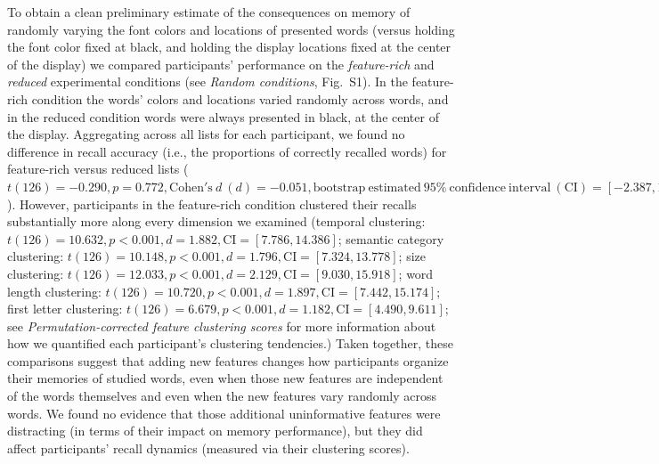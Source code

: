 \documentclass[11pt]{article}
\newcommand{\dynamicsRandom}{S1}
\begin{document}
To obtain a clean preliminary estimate of the consequences on memory of
randomly varying the font colors and locations of presented words (versus
holding the font color fixed at black, and holding the display locations fixed
at the center of the display) we compared participants' performance on the
\textit{feature-rich} and \textit{reduced} experimental conditions (see
\textit{Random conditions}, Fig.~\dynamicsRandom). In the feature-rich
condition the words' colors and locations varied randomly across words, and in
the reduced condition words were always presented in black, at the center of
the display. Aggregating across all lists for each participant, we found no
difference in recall accuracy (i.e., the proportions of correctly recalled
words) for feature-rich versus reduced lists ($t(126) = -0.290, p = 0.772,
\mathrm{Cohen's}~d~(d) = -0.051,
\mathrm{bootstrap~estimated~95\%~confidence~interval}~(\mathrm{CI}) = [-2.387,
1.768]$). However, participants in the feature-rich condition clustered their
recalls substantially more along every dimension we examined (temporal
clustering: $t(126) = 10.632, p < 0.001, d = 1.882, \mathrm{CI} = [7.786,
14.386]$; semantic category clustering: $t(126) = 10.148, p < 0.001, d = 1.796,
\mathrm{CI} = [7.324, 13.778] $; size clustering: $t(126) = 12.033, p < 0.001,
d = 2.129, \mathrm{CI} = [9.030, 15.918]$; word length clustering: $t(126) =
10.720, p < 0.001, d = 1.897, \mathrm{CI} = [7.442, 15.174]$; first letter
clustering: $t(126) = 6.679, p < 0.001, d = 1.182, \mathrm{CI} = [4.490,
9.611]$; see \textit{Permutation-corrected feature clustering scores} for more
information about how we quantified each participant's clustering tendencies.)
Taken together, these comparisons suggest that adding new features changes how
participants organize their memories of studied words, even when those new
features are independent of the words themselves and even when the new features
vary randomly across words. We found no evidence that those additional
uninformative features were distracting (in terms of their impact on memory
performance), but they did affect participants' recall dynamics (measured via
their clustering scores).
\end{document}
